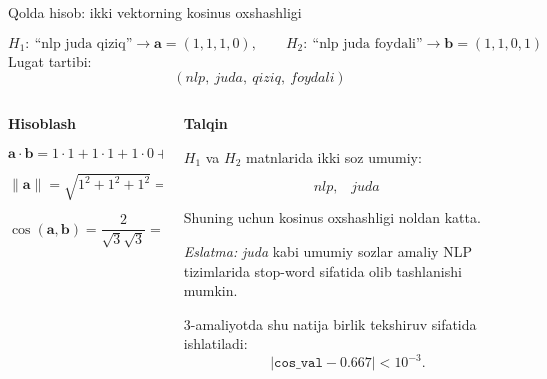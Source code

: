 \documentclass[aspectratio=169,11pt]{beamer}
\begin{document}
%
\begin{frame}{Qo\textquotesingle{}lda hisob: ikki vektorning kosinus o\textquotesingle{}xshashligi}
\small

\begin{tcolorbox}[defbox]
\[
H_1:\ \text{``nlp juda qiziq''}\rightarrow
\mathbf{a}=(1,1,1,0),
\qquad
H_2:\ \text{``nlp juda foydali''}\rightarrow
\mathbf{b}=(1,1,0,1)
\]
\footnotesize
Lug\textquotesingle{}at tartibi:
\[
(\textit{nlp},\ \textit{juda},\ \textit{qiziq},\ \textit{foydali})
\]
\end{tcolorbox}

\vspace{3pt}

\begin{columns}[T,totalwidth=\textwidth]
\begin{column}{0.52\textwidth}
\textbf{Hisoblash}

\[
\mathbf{a}\cdot\mathbf{b}
=1\cdot1+1\cdot1+1\cdot0+0\cdot1=2
\]

\[
\|\mathbf{a}\|=\sqrt{1^2+1^2+1^2}=\sqrt{3},
\qquad
\|\mathbf{b}\|=\sqrt{3}
\]

\[
\cos(\mathbf{a},\mathbf{b})
=
\frac{2}{\sqrt{3}\sqrt{3}}
=
\frac{2}{3}
\approx 0.667
\]
\end{column}

\begin{column}{0.44\textwidth}
\textbf{Talqin}

\vspace{3pt}
\footnotesize
$H_1$ va $H_2$ matnlarida ikki so\textquotesingle{}z umumiy:

\[
\textit{nlp},\quad \textit{juda}
\]

Shuning uchun kosinus o\textquotesingle{}xshashligi noldan katta.

\vspace{5pt}

\begin{tcolorbox}[alertbox]
\footnotesize
\textit{Eslatma:} \textit{juda} kabi umumiy so\textquotesingle{}zlar amaliy
NLP tizimlarida stop-word sifatida olib tashlanishi mumkin.
\end{tcolorbox}

\vspace{3pt}

\footnotesize
3-amaliyotda shu natija birlik tekshiruv sifatida ishlatiladi:
\[
|\texttt{cos\_val}-0.667|<10^{-3}.
\]
\end{column}
\end{columns}

\end{frame}
\end{document}
